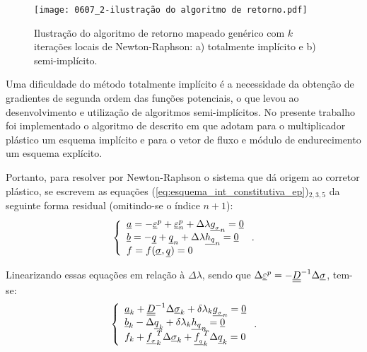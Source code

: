 \begin{figure}[H]
	\begin{center}
		\texttt{[image: 0607\_2-ilustração do algoritmo de retorno.pdf]}
	\end{center}
	\caption{\label{algoritmo_retorno}Ilustração do algoritmo de retorno mapeado genérico com $k$ iterações locais de Newton-Raphson: a) totalmente implícito e b) semi-implícito.}
\end{figure}

Uma dificuldade do método totalmente implícito é a necessidade da obtenção de gradientes de segunda ordem das funções potenciais, o que levou ao desenvolvimento e utilização de algoritmos semi-implícitos. No presente trabalho foi implementado o algoritmo de  descrito em  que adotam para o multiplicador plástico um esquema implícito e para o vetor de fluxo e módulo de endurecimento um esquema explícito.

Portanto, para resolver por Newton-Raphson o sistema que dá origem ao corretor plástico, se escrevem as equações (\ref{eq:esquema_int_constitutiva_ep})$_{2,3,5}$ da seguinte forma residual (omitindo-se o índice $n+1$):
\begin{equation}
	\label{eq:algoritmo_ep_1}
	\left\{
	\begin{array}{lcl}
		\underline{a} = -\underline{\varepsilon}^p + \underline{\varepsilon}_n^p + \Delta \lambda \underline{g_{_\sigma}}_n = \underline{0}	\\
		\underline{b} = -\underline q + \underline q_n + \Delta\lambda\underline{h_q}_n = \underline{0} \\
		f = f(\underline \sigma,\underline q) = 0
	\end{array}
	\right..
\end{equation}

Linearizando essas equações em relação à $\Delta \lambda$, sendo que $\Delta \underline{\varepsilon}^p = - \underline{\underline D}^{-1}\Delta\underline \sigma$, tem-se:
\begin{equation}
	\label{eq:algoritmo_ep_2}
	\left\{
	\begin{array}{lcl}
		\underline{a}_k + \underline{\underline D}^{-1}\Delta\underline \sigma_k + \delta \lambda_k \underline{g_{_\sigma}}_n = \underline{0} \\
		\underline{b}_k - \Delta \underline q_k + \delta \lambda_k \underline{h_q}_n = \underline{0} \\
		f_k + \underline{f_{_\sigma}}_k^T\Delta\underline \sigma_k + \underline{f_{_q}}_k^T \Delta \underline q_k = 0
	\end{array}
	\right..
\end{equation}

